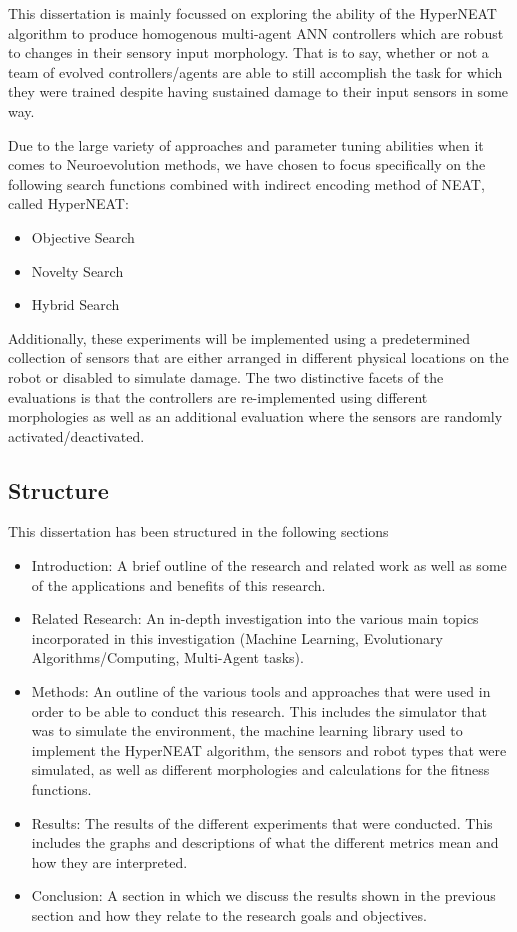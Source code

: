 This dissertation is mainly focussed on exploring the ability of the HyperNEAT algorithm to produce homogenous multi-agent ANN controllers which are robust to changes in their sensory input morphology. That is to say, whether or not a team of evolved controllers/agents are able to still accomplish the task for which they were trained despite having sustained damage to their input sensors in some way.

Due to the large variety of approaches and parameter tuning abilities when it comes to Neuroevolution methods, we have chosen to focus specifically on the following search functions combined with indirect encoding method of NEAT, called HyperNEAT:
\begin{itemize}
	\item Objective Search
	\item Novelty Search
	\item Hybrid Search
\end{itemize}

Additionally, these experiments will be implemented using a predetermined collection of sensors that are either arranged in different physical locations on the robot or disabled to simulate damage.  The two distinctive facets of the evaluations is that the controllers are re-implemented using different morphologies as well as an additional evaluation where the sensors are randomly activated/deactivated.

\subsection{Structure}
This dissertation has been structured in the following sections
\begin{itemize}
	\item Introduction: A brief outline of the research and related work as well as some of the applications and benefits of this research.
	\item Related Research: An in-depth investigation into the various main topics incorporated in this investigation (Machine Learning, Evolutionary Algorithms/Computing, Multi-Agent tasks).
	\item Methods: An outline of the various tools and approaches that were used in order to be able to conduct this research. This includes the simulator that was to simulate the environment, the machine learning library used to implement the HyperNEAT algorithm, the sensors and robot types that were simulated, as well as different morphologies and calculations for the fitness functions.
	\item Results: The results of the different experiments that were conducted. This includes the graphs and descriptions of what the different metrics mean and how they are interpreted.
	\item Conclusion: A section in which we discuss the results shown in the previous section and how they relate to the research goals and objectives.
\end{itemize}



